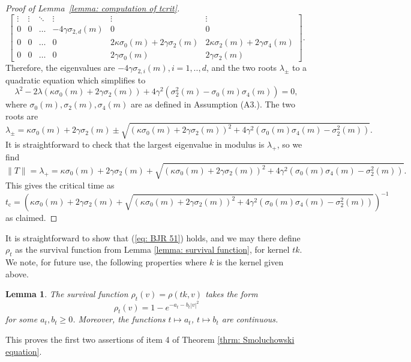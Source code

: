 \documentclass[11pt, notitlepage]{article}
\newtheorem{lem}[thm]{Lemma}
\begin{document}
\begin{proof}[Proof of Lemma~\ref{lemma: computation of tcrit}]
\begin{equation}
\begin{bmatrix}
    \vdots & \vdots  & \ddots & \vdots &\vdots & \vdots \\
    0 & 0&  \dots & -4\gamma \sigma_{2,d}(m) & 0 &0\\
    0&0   & \dots &0 & 2\kappa\sigma_0(m)+2\gamma\sigma_2(m) & 2\kappa\sigma_2(m)+2\gamma \sigma_4(m) \\ 
    0& 0 & \dots & 0& 2\gamma \sigma_0(m) & 2\gamma \sigma_2(m)
\end{bmatrix}.
   \end{equation} Therefore, the eigenvalues are $-4\gamma \sigma_{2,i}(m), i=1,..,d$, and the two roots  $\lambda_\pm$ to a quadratic equation which simplifies to \begin{equation}
       \lambda^2-2\lambda(\kappa\sigma_0(m)+2\gamma\sigma_2(m))+4\gamma^2(\sigma_2^2(m)-\sigma_0(m)\sigma_4(m))=0,
   \end{equation} 
   where $\sigma_0(m), \sigma_2(m), \sigma_4(m)$ are as defined in Assumption (A3.).
   The two roots are \begin{equation}
       \lambda_\pm=\kappa\sigma_0(m) +2\gamma\sigma_2(m) \pm \sqrt{(\kappa\sigma_0(m)+2\gamma\sigma_2(m))^2+4\gamma^2(\sigma_0(m)\sigma_4(m)-\sigma_2^2(m))}.
   \end{equation} It is straightforward to check that the largest eigenvalue in modulus is $\lambda_+$, so we find \begin{equation}
       \|T\|=\lambda_+=\kappa\sigma_0(m) +2\gamma\sigma_2(m) + \sqrt{(\kappa\sigma_0(m)+2\gamma\sigma_2(m))^2+4\gamma^2(\sigma_0(m)\sigma_4(m)-\sigma_2^2(m))}.
   \end{equation} This gives the critical time as \begin{equation}
       t_\text{c}= \left(\kappa\sigma_0(m) +2\gamma\sigma_2(m) + \sqrt{(\kappa\sigma_0(m)+2\gamma\sigma_2(m))^2+4\gamma^2(\sigma_0(m)\sigma_4(m)-\sigma_2^2(m))}\right)^{-1}
   \end{equation} as claimed.\end{proof}
It is straightforward to show that (\ref{eq: BJR 51}) holds, and we may there define $\rho_t$ as the survival function from Lemma \ref{lemma: survival function}, for kernel $tk$. We note, for future use, the following properties where $k$ is the kernel given above.
\begin{lem}\label{lemma: form of rho-t}
    The survival function $\rho_t(v)=\rho(tk,v)$ takes the form \begin{equation}
        \rho_t(v)=1-e^{-a_t-b_t|v|^2}
    \end{equation} for some $a_t, b_t \ge 0$. Moreover, the functions $t\mapsto a_t$, $t\mapsto b_t$ are continuous.
\end{lem} This proves the first two assertions of item 4 of Theorem \ref{thrm: Smoluchowski equation}.
\end{document}
